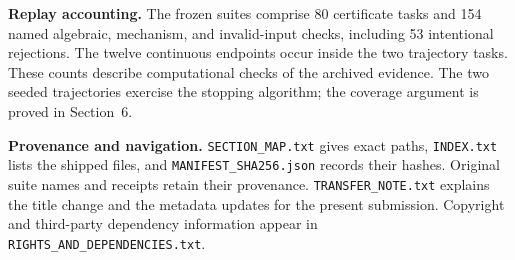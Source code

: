 \documentclass[11pt]{article}
\begin{document}
\textbf{Replay accounting.} The frozen suites comprise 80 certificate tasks and
154 named algebraic, mechanism, and invalid-input checks, including 53 intentional
rejections. The twelve continuous endpoints occur inside the two trajectory tasks.
These counts describe computational checks of the archived evidence. The two
seeded trajectories exercise the stopping algorithm; the coverage argument is
proved in Section~6.

\textbf{Provenance and navigation.} \texttt{SECTION\_MAP.txt} gives exact paths,
\texttt{INDEX.txt} lists the shipped files, and
\texttt{MANIFEST\_SHA256.json} records their hashes. Original suite names and
receipts retain their provenance. \texttt{TRANSFER\_NOTE.txt} explains the title
change and the metadata updates for the present submission. Copyright and
third-party dependency information appear in
\nolinkurl{RIGHTS_AND_DEPENDENCIES.txt}.
\end{document}

